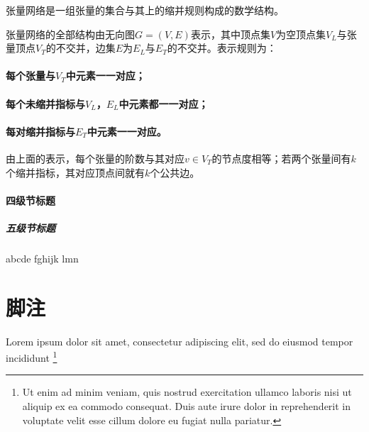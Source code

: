 张量网络是一组张量的集合与其上的缩并规则构成的数学结构。

张量网络的全部结构由无向图$G=(V,E)$表示，其中顶点集$V$为空顶点集$V_L$与张量顶点$V_T$的不交并，边集$E$为$E_L$与$E_T$的不交并。表示规则为：
\paragraph{每个张量与$V_T$中元素一一对应；}

\paragraph{每个未缩并指标与$V_L$，$E_L$中元素都一一对应；}

\paragraph{每对缩并指标与$E_T$中元素一一对应。}

由上面的表示，每个张量的阶数与其对应$v\in V_T$的节点度相等；若两个张量间有$k$个缩并指标，其对应顶点间就有$k$个公共边。

\paragraph{四级节标题}

\subparagraph{五级节标题}

abcde fghijk lmn

\section{脚注}

Lorem ipsum dolor sit amet, consectetur adipiscing elit, sed do eiusmod tempor
incididunt 
\footnote{Ut enim ad minim veniam, quis nostrud exercitation ullamco laboris
  nisi ut aliquip ex ea commodo consequat.
  Duis aute irure dolor in reprehenderit in voluptate velit esse cillum dolore
  eu fugiat nulla pariatur.}
